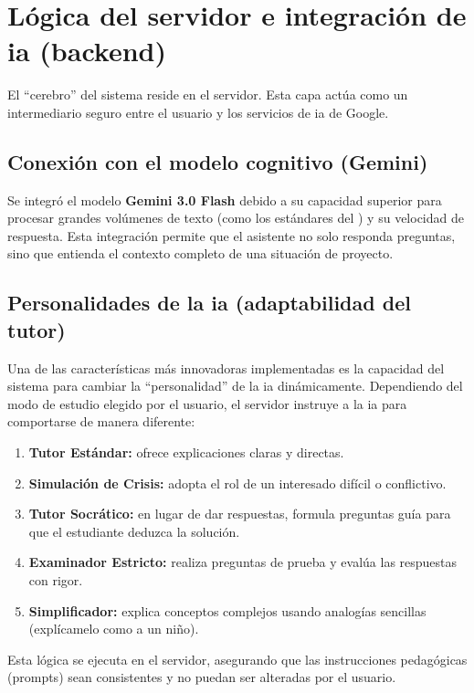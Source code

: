 \section{Lógica del servidor e integración de \gls{ia} (backend)}

El \enquote{cerebro} del sistema reside en el servidor. Esta capa actúa como un intermediario seguro entre el usuario y los servicios de \gls{ia} de Google.

\subsection{Conexión con el modelo cognitivo (Gemini)}
Se integró el modelo \textbf{Gemini 3.0 Flash} debido a su capacidad superior para procesar grandes volúmenes de texto (como los estándares del ) y su velocidad de respuesta. Esta integración permite que el asistente no solo responda preguntas, sino que entienda el contexto completo de una situación de proyecto.

\subsection{Personalidades de la \gls{ia} (adaptabilidad del tutor)}
Una de las características más innovadoras implementadas es la capacidad del sistema para cambiar la \enquote{personalidad} de la \gls{ia} dinámicamente. Dependiendo del modo de estudio elegido por el usuario, el servidor instruye a la \gls{ia} para comportarse de manera diferente:

\begin{enumerate}
\item \textbf{Tutor Estándar:} ofrece explicaciones claras y directas.
\item \textbf{Simulación de Crisis:} adopta el rol de un interesado difícil o conflictivo.
\item \textbf{Tutor Socrático:} en lugar de dar respuestas, formula preguntas guía para que el estudiante deduzca la solución.
\item \textbf{Examinador Estricto:} realiza preguntas de prueba y evalúa las respuestas con rigor.
\item \textbf{Simplificador:} explica conceptos complejos usando analogías sencillas (explícamelo como a un niño).
\end{enumerate}

Esta lógica se ejecuta en el servidor, asegurando que las instrucciones pedagógicas (prompts) sean consistentes y no puedan ser alteradas por el usuario.

